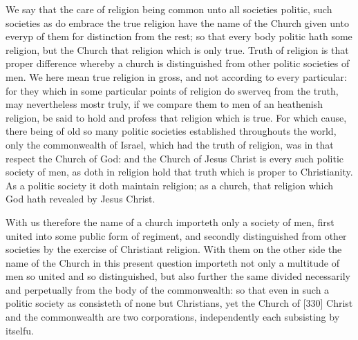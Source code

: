 We say that the care of religion being common unto all societies politic, such societies as do embrace the true religion have the name of the Church given unto everyp of them for distinction from the rest; so that every body politic hath some religion, but the Church that religion which is only true. Truth of religion is that proper difference whereby a church is distinguished from other politic societies of men. We here mean true religion in gross, and not according to every particular: for they which in some particular points of religion do swerveq from the truth, may nevertheless mostr truly, if we compare them to men of an heathenish religion, be said to hold and profess that religion which is true. For which cause, there being of old so many politic societies established throughouts the world, only the commonwealth of Israel, which had the truth of religion, was in that respect the Church of God: and the Church of Jesus Christ is every such politic society of men, as doth in religion hold that truth which is proper to Christianity. As a politic society it doth maintain religion; as a church, that religion which God hath revealed by Jesus Christ.

With us therefore the name of a church importeth only a society of men, first united into some public form of regiment, and secondly distinguished from other societies by the exercise of Christiant religion. With them on the other side the name of the Church in this present question importeth not only a multitude of men so united and so distinguished, but also further the same divided necessarily and perpetually from the body of the commonwealth: so that even in such a politic society as consisteth of none but Christians, yet the Church of [330] Christ and the commonwealth are two corporations, independently each subsisting by itselfu.

